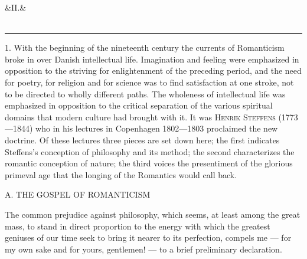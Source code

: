 \documentclass[12pt,a4paper,openany]{book}
\newcommand{\opage}[1]{\marginnote{\footnotesize\textit{[#1]}}}
\newcommand{\anthsection}[2]{\clearpage\begin{center}\ifx&#1&\else{\large #1}\\[0.6em]\fi{\Large #2}\\[0.5em]\rule{3em}{0.4pt}\end{center}\medskip}
\newcommand{\excerpthead}[1]{\par\bigskip\begin{center}#1\end{center}\nopagebreak\smallskip}
\newenvironment{intro}{\par}{\par}
\begin{document}
\setcounter{footnote}{0}%
\anthsection{II.} {STEFFENS AND GRUNDTVIG}\opage{45}

\begin{intro}

1. With the beginning of the nineteenth century the currents of Romanticism broke
in over Danish intellectual life. Imagination and feeling were emphasized in
opposition to the striving for enlightenment of the preceding period, and the need
for poetry, for religion and for science was to find satisfaction at one stroke,
not to be directed to wholly different paths. The wholeness of intellectual life
was emphasized in opposition to the critical separation of the various spiritual
domains that modern culture had brought with it. It was \textsc{Henrik}
\textsc{Steffens} (1773---1844) who in his lectures in Copenhagen
1802---1803 proclaimed the new doctrine. Of these lectures three pieces are set
down here; the first indicates Steffens's conception of philosophy and its method;
the second characterizes the romantic conception of nature; the third voices the
presentiment of the glorious primeval age that the longing of the Romantics would
call back.
\end{intro}

\excerpthead{A. THE GOSPEL OF ROMANTICISM}


The common prejudice against philosophy, which seems, at least among the great
mass, to stand in direct proportion to the energy with which the greatest geniuses
of our time seek to bring it nearer to its perfection, compels me --- for my own
sake and for yours, gentlemen! --- to a brief preliminary declaration.
\end{document}
